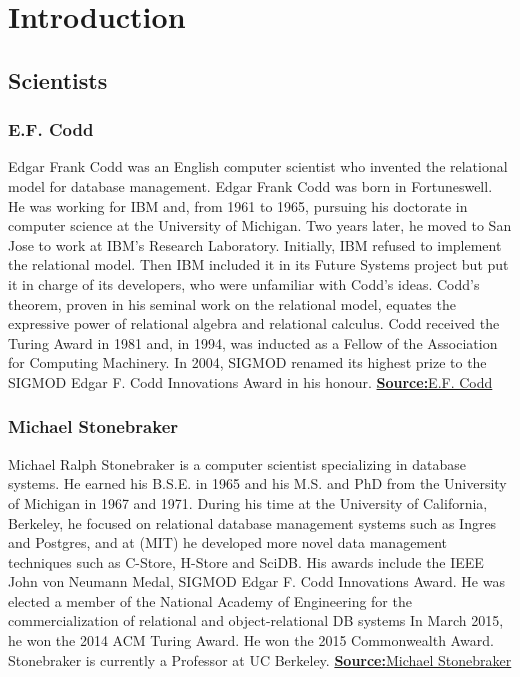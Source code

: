\documentclass{article}
\author{Shashank P, 200010048}
\date{\today}
\newcounter{late}
\begin{document}
\maketitle
\section{Introduction}
\subsection{Scientists}
\subsubsection{E.F. Codd}
\hspace{\parindent} Edgar Frank Codd was an English computer scientist who invented the relational model for database management.
Edgar Frank Codd was born in Fortuneswell.
He was working for IBM and, from 1961 to 1965, pursuing his doctorate in computer science at the University of Michigan. 
Two years later, he moved to San Jose to work at IBM's Research Laboratory.
Initially, IBM refused to implement the relational model.
Then IBM included it in its Future Systems project
but put it in charge of its developers, who were unfamiliar with Codd's ideas.
Codd's theorem, proven in his seminal work on the relational model, equates the expressive power of 
relational algebra and relational calculus.
Codd received the Turing Award in 1981 and, in 1994, was inducted as a Fellow of the Association for Computing Machinery.
In 2004, SIGMOD renamed its highest prize to the SIGMOD Edgar F. Codd Innovations Award in his honour.  \newline \newline
\textbf{\underline{Source:}}\hspace{\parindent}\href{https://en.wikipedia.org/wiki/Edgar_F._Codd}{E.F. Codd}
\subsubsection{Michael Stonebraker}
\hspace{\parindent}Michael Ralph Stonebraker is a computer scientist specializing in database systems. 
He earned his B.S.E. in 1965 and his M.S. and PhD from the University of Michigan in 1967 and 1971.
During his time at the University of California, Berkeley, he focused on relational database 
management systems such as Ingres and Postgres, and at 
(MIT) he developed more novel data management techniques such as C-Store, H-Store and SciDB.
His awards include the IEEE John von Neumann Medal, SIGMOD Edgar F. Codd Innovations Award.
He was elected a member of the National Academy of Engineering for the
commercialization of relational and object-relational DB systems
In March 2015, he won the 2014 ACM Turing Award.
He won the 2015 Commonwealth Award.
Stonebraker is currently a Professor at UC Berkeley.  \newline \newline
\textbf{\underline{Source:}}\hspace{\parindent}\href{https://en.wikipedia.org/wiki/Michael_Stonebraker}{Michael Stonebraker}
\end{document}
